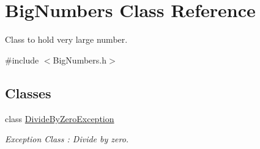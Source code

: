 \hypertarget{classBigNumbers}{}\section{Big\+Numbers Class Reference}
\label{classBigNumbers}


Class to hold very large number.  




{\ttfamily \#include $<$Big\+Numbers.\+h$>$}

\subsection*{Classes}
\begin{DoxyCompactItemize}
\item 
class \mbox{\hyperlink{classBigNumbers_1_1DivideByZeroException}{Divide\+By\+Zero\+Exception}}
\begin{DoxyCompactList}\small\item\em Exception Class \+: Divide by zero. \end{DoxyCompactList}\end{DoxyCompactItemize}
